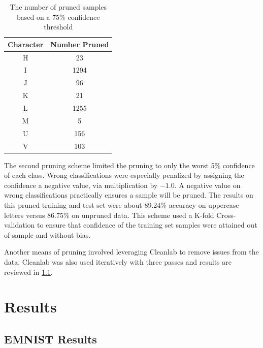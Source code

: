 \documentclass[conference]{IEEEtran}
\begin{document}
\begin{table}
    \centering
    \begin{tabular}{|c|c|}
        \hline
        Character & Number Pruned \\
        \hline
        \hline
        H & 23 \\
        I & 1294 \\
        J & 96 \\
        K & 21 \\
        L & 1255 \\
        M & 5 \\
        U & 156 \\
        V & 103 \\
        \hline
    \end{tabular}
    \caption{\label{tab_threshold_pruning_qty}The number of pruned samples based on a 75\% confidence threshold}
\end{table}

The second pruning scheme limited the pruning to only the worst 5\% confidence
of each class. Wrong classifications were especially penalized by assigning the
confidence a negative value, via multiplication by $-1.0$.  A negative value on
wrong classifications practically ensures a sample will be pruned. The results on
this pruned training and test set were about 89.24\% accuracy on uppercase letters
versus 86.75\% on unpruned data.  This scheme used a K-fold Cross-validation to
ensure that confidence of the training set samples were attained out of sample
and without bias.

Another means of pruning involved leveraging Cleanlab to remove issues from the data.
Cleanlab was also used iteratively with three passes and results are reviewed in
\ref{emnist_results}.

\section{Results}




\subsection{EMNIST Results}
\label{emnist_results}
\end{document}
